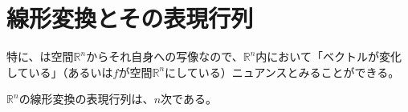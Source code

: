 \documentclass[../../../topic_linear-algebra]{subfiles}
\begin{document}
\sectionline
\section{線形変換とその表現行列}

特に、は空間$\mathbb{R}^n$からそれ自身への写像なので、$\mathbb{R}^n$内において「ベクトルが変化している」（あるいは$f$が空間$\mathbb{R}^n$にしている）ニュアンスとみることができる。

\br

$\mathbb{R}^n$の線形変換の表現行列は、$n$次である。

\begin{mindflow}
\end{mindflow}
\end{document}
